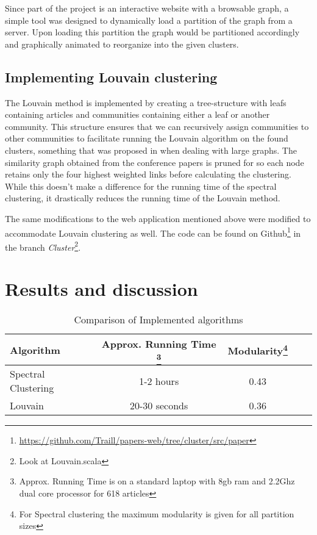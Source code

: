 Since part of the project is an interactive website with a browsable 
graph, a simple tool was designed to dynamically load a partition of the 
graph from a server.  Upon loading this partition the graph would be 
partitioned accordingly and graphically animated to reorganize into the 
given clusters.

\subsection{Implementing Louvain clustering}

The Louvain method is implemented by creating a tree-structure with 
leafs containing articles and communities containing either a leaf or 
another community. This structure ensures that we can recursively assign 
communities to other communities to facilitate running the Louvain 
algorithm on the found clusters, something that was proposed in 
\cite{blondel2008} when dealing with large graphs. The similarity graph 
obtained from the conference papers is pruned for so each node retains 
only the four highest weighted links before calculating the clustering.  
While this doesn't make a difference for the running time of the 
spectral clustering, it drastically reduces the running time of the 
Louvain method.

The same modifications to the web application mentioned above were 
modified to accommodate Louvain clustering as well. The code can be 
found on 
Github\footnote{\url{https://github.com/Traill/papers-web/tree/cluster/src/paper}} 
in the branch \emph{Cluster}\footnote{Look at Louvain.scala}.

\section{Results and discussion}

\begin{savenotes}
\begin{table}
	\small
\begin{tabular}{l*{4}{c}}
	Algorithm & Approx. Running Time \footnote{Approx. Running Time is 
	on a standard laptop with 8gb ram and 2.2Ghz dual core processor for 
618 articles}& Modularity\footnote{For Spectral clustering the maximum 
modularity is given for all partition sizes} \\
	\hline
	\noalign{\smallskip} 
	Spectral Clustering & 1-2 hours & 0.43  \\
	Louvain & 20-30 seconds & 0.36 \\
\end{tabular}
\caption{Comparison of Implemented algorithms}
\label{table:stats}
\end{table}
\end{savenotes}

